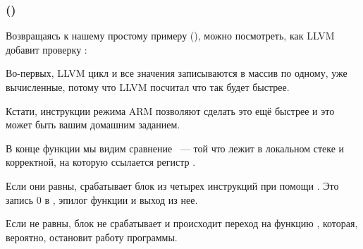 \subsubsection{\OptimizingXcodeIV (\ThumbTwoMode)}

Возвращаясь к нашему простому примеру
 (),
можно посмотреть, как LLVM добавит проверку :



Во-первых, LLVM  цикл и все значения записываются в массив по одному, 
уже вычисленные, потому что LLVM посчитал что так будет быстрее.

Кстати, инструкции режима ARM позволяют сделать это ещё быстрее и это может быть вашим 
домашним заданием.

В конце функции мы видим сравнение ~--- той что лежит в локальном стеке и корректной, 
на которую ссылается регистр .

Если они равны, срабатывает блок из четырех инструкций при помощи .
Это запись 0 в , эпилог функции и выход из нее.

Если  не равны, блок не срабатывает и происходит
переход на функцию , которая, вероятно, остановит работу программы.

